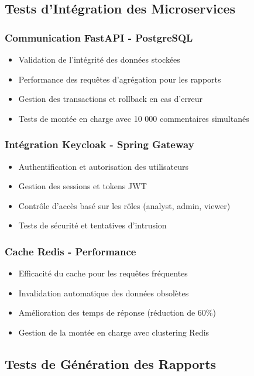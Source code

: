 \subsection{Tests d'Intégration des Microservices}

\subsubsection{Communication FastAPI - PostgreSQL}
\begin{itemize}
    \item Validation de l'intégrité des données stockées
    \item Performance des requêtes d'agrégation pour les rapports
    \item Gestion des transactions et rollback en cas d'erreur
    \item Tests de montée en charge avec 10 000 commentaires simultanés
\end{itemize}

\subsubsection{Intégration Keycloak - Spring Gateway}
\begin{itemize}
    \item Authentification et autorisation des utilisateurs
    \item Gestion des sessions et tokens JWT
    \item Contrôle d'accès basé sur les rôles (analyst, admin, viewer)
    \item Tests de sécurité et tentatives d'intrusion
\end{itemize}

\subsubsection{Cache Redis - Performance}
\begin{itemize}
    \item Efficacité du cache pour les requêtes fréquentes
    \item Invalidation automatique des données obsolètes
    \item Amélioration des temps de réponse (réduction de 60\%)
    \item Gestion de la montée en charge avec clustering Redis
\end{itemize}

\subsection{Tests de Génération des Rapports}

